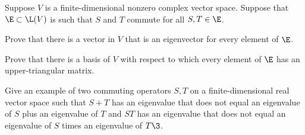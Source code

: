 \exercise
Suppose $V$ is a finite-dimensional nonzero complex vector space. Suppose that $\E \subset \L(V)$ is such that $S$ and $T$ commute for all $S, T \in \E$. \label{4ManyOps}
\begin{subtheorem}
\item
Prove that there is a vector in $V$ that is an eigenvector for every element of $\E$.
\item
Prove that there is a basis of $V$ with respect to which every element of $\E$ has an upper-triangular matrix.
\end{subtheorem}
%


\exercise
Give an example of two commuting operators $S, T$ on a finite-dimensional real vector space such that $S+T$ has an eigenvalue that does not equal an eigenvalue of $S$ plus an eigenvalue of $T$ and $ST$ has an eigenvalue that does not equal an eigenvalue of $S$ times an eigenvalue of $T\3$.


